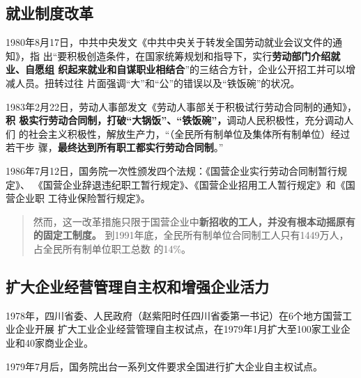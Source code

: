 \subsection{就业制度改革}

1980年8月17日，中共中央发文《中共中央关于转发全国劳动就业会议文件的通知》，指
出“要积极创造条件，在国家统筹规划和指导下，实行\textbf{劳动部门介绍就业、自愿组
  织起来就业和自谋职业相结合}”的三结合方针，企业公开招工并可以增减人员。扭转过往
片面强调“大”和“公”的错误以及“铁饭碗”的状况。

1983年2月22日，劳动人事部发文《劳动人事部关于积极试行劳动合同制的通知》，\textbf{积
  极实行劳动合同制，打破“大锅饭”、“铁饭碗”，}调动人民积极性，充分调动人们
的社会主义积极性，解放生产力，“（全民所有制单位及集体所有制单位）经过若干步
骤，\textbf{最终达到所有职工都实行劳动合同制}。”

1986年7月12日，国务院一次性颁发四个法规：《国营企业实行劳动合同制暂行规定》、
《国营企业辞退违纪职工暂行规定》、《国营企业招用工人暂行规定》和《国营企业职
工待业保险暂行规定》。
\begin{quotation}
  然而，这一改革措施只限于国营企业中\textbf{新招收的工人，并没有根本动摇原有的固定工制度。}
  到1991年底，全民所有制单位合同制工人只有1449万人，占全民所有制单位职工总数
  的14\%。\cite{laodongzhiduyuanfang}
\end{quotation}



\subsection{扩大企业经营管理自主权和增强企业活力}

1978年，四川省委、人民政府（赵紫阳时任四川省委第一书记）在6个地方国营工业企业开展
扩大工业企业经营管理自主权试点，在1979年1月扩大至100家工业企业和40家商业企业。

1979年7月后，国务院出台一系列文件要求全国进行扩大企业自主权试点。

